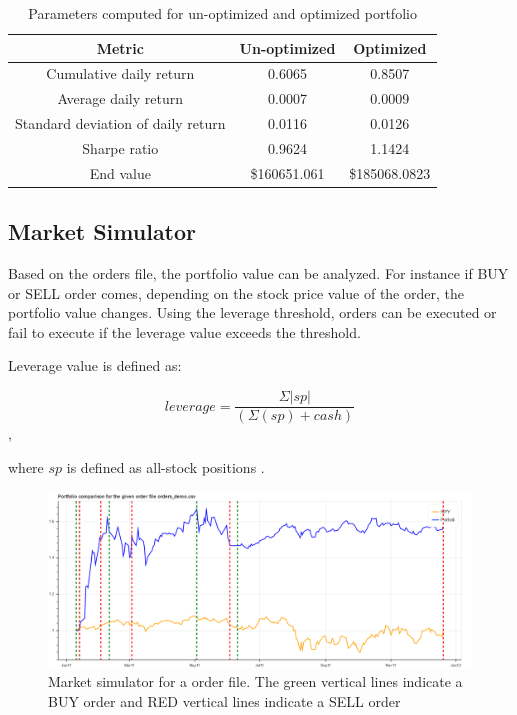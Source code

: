 \documentclass[12pt]{article}
\begin{document}
\begin{itemize}
\begin{table}
\begin{center}
\begin{tabular} {|c|c|c|}
\hline \hline
\textbf{Metric} & \textbf{Un-optimized} & \textbf{Optimized}  \\ \hline
Cumulative daily return & 0.6065 & 0.8507 \\ \hline
Average daily return & 0.0007 & 0.0009\\ \hline
Standard deviation of daily return  & 0.0116 & 0.0126  \\ \hline
Sharpe ratio & 0.9624 & 1.1424 \\ \hline
End value & \$160651.061 & \$185068.0823 \\ \hline
\hline
\end{tabular}
\end{center}
\caption{Parameters computed for un-optimized and optimized portfolio}
\label{tab:portparam}
\end{table}



\subsection{Market Simulator}
\label{sec:sim}
Based on the orders file, the portfolio value can be analyzed. For instance if BUY or SELL order comes, depending on the stock price value of the order, the portfolio value changes. Using the leverage threshold, orders can be executed or fail to execute if the leverage value exceeds the threshold.

Leverage value is defined as:

\[ leverage = \frac{\Sigma|sp|} {(\Sigma(sp) + cash) }\],

where $sp$ is defined as all-stock positions \cite{GeTechCourse}. 

\begin{figure}[!htbp]
\begin{center}
\includegraphics[height=0.5\textheight,width=\textwidth]{market.png}
\caption{Market simulator for a order file. The green vertical lines indicate a BUY order and RED vertical lines indicate a SELL order }
\end{center}
\label{fig:sim}
\end{figure}


\end{itemize}
\end{document}
